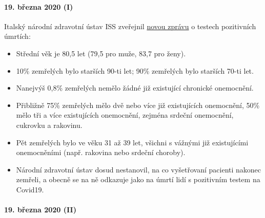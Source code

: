 \hypertarget{19-bux159ezna-2020-i}{%
\paragraph{19. března 2020 (I)}\label{19-bux159ezna-2020-i}}

Italský národní zdravotní ústav ISS zveřejnil
\href{https://www.epicentro.iss.it/coronavirus/bollettino/Report-COVID-2019_17_marzo-v2.pdf}{novou
zprávu} o testech pozitivních úmrtích:

\begin{itemize}
\tightlist
\item
  Střední věk je 80,5 let (79,5 pro muže, 83,7 pro ženy).
\item
  10\% zemřelých bylo starších 90-ti let; 90\% zemřelých bylo starších
  70-ti let.
\item
  Nanejvýš 0,8\% zemřelých nemělo žádné již existující chronické
  onemocnění.
\item
  Přibližně 75\% zemřelých mělo dvě nebo více již existujících
  onemocnění, 50\% mělo tři a více existujících onemocnění, zejména
  srdeční onemocnění, cukrovku a rakovinu.
\item
  Pět zemřelých bylo ve věku 31 až 39 let, všichni s vážnými již
  existujícími onemocněními (např. rakovina nebo srdeční choroby).
\item
  Národní zdravotní ústav dosud nestanovil, na co vyšetřovaní pacienti
  nakonec zemřeli, a obecně se na ně odkazuje jako na úmrtí lidí s
  pozitivním testem na Covid19.
\end{itemize}

\hypertarget{19-bux159ezna-2020-ii}{%
\paragraph{19. března 2020 (II)}\label{19-bux159ezna-2020-ii}}

